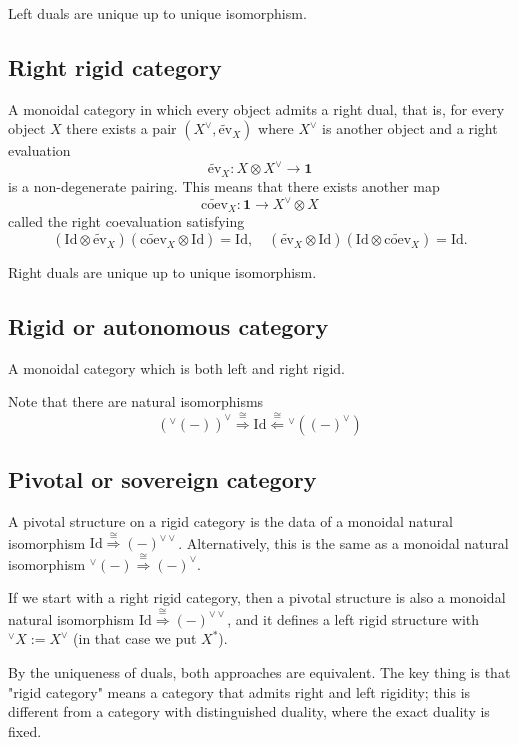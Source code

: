 \documentclass[11pt]{article}
\theoremstyle{definition}
\begin{document}
Left duals are unique up to unique isomorphism.

\subsection{Right rigid category}
A monoidal category in which every object admits a right dual, that is, for every object \( X \) there exists a pair \( (X^\vee, \widetilde{\mathrm{ev}}_X) \) where \( X^\vee\) is another object and a right evaluation
\[ \widetilde{\mathrm{ev}}_X :X \otimes X^\vee  \to  \mathbf{1} \]
is a non-degenerate pairing. This means that there exists another map
\[ \widetilde{\mathrm{coev}}_X : \mathbf{1}  \to X^\vee \otimes  X \]
called the right coevaluation satisfying
\[
(\mathrm{Id} \otimes  \widetilde{\mathrm{ev}}_X)(\widetilde{\mathrm{coev}}_X \otimes \mathrm{Id} ) = \mathrm{Id}, \quad (\widetilde{\mathrm{ev}}_X \otimes \mathrm{Id}  )(\mathrm{Id} \otimes \widetilde{\mathrm{coev}}_X  ) = \mathrm{Id}.
\]

Right duals are unique up to unique isomorphism.

\subsection{Rigid or autonomous category}
A monoidal category which is both left and right rigid.

Note that there are natural isomorphisms $$ ( {}^\vee(-))^\vee \overset{\cong}{\Longrightarrow}  \mathrm{Id} \overset{\cong}{\Longleftarrow}  {}^\vee((-)^\vee ) $$


\subsection{Pivotal or sovereign category}
A pivotal structure on a rigid category is the data of  a monoidal natural isomorphism $\mathrm{Id} \overset{\cong}{\Longrightarrow} (-)^{\vee \vee}$. Alternatively, this is the same as a monoidal natural isomorphism ${}^\vee (-) \overset{\cong}{\Longrightarrow} (-)^\vee$.



If we start with a right rigid category, then a pivotal structure is also  a monoidal natural isomorphism $\mathrm{Id} \overset{\cong}{\Longrightarrow} (-)^{\vee \vee}$, and it defines a left rigid structure with  ${}^\vee X:= X^\vee$  (in that case we put $X^*$).

By the uniqueness of duals, both approaches are equivalent. The key thing is that "rigid category" means a category that admits right and left rigidity; this is different from a category with distinguished duality, where the exact duality is fixed. 
\end{document}
